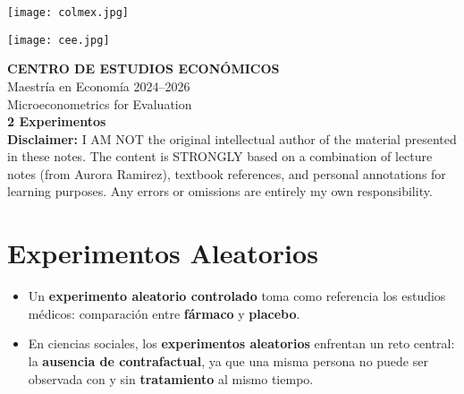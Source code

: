 \documentclass[12pt]{article}
\title{}
\author{}
\date{}
\begin{document}
\begin{titlepage}
    \vspace*{-1cm}
    \noindent
    \begin{minipage}[t]{0.49\textwidth}
        \texttt{[image: colmex.jpg]}
    \end{minipage}%
    \begin{minipage}[t]{0.49\textwidth}
        \raggedleft
        \texttt{[image: cee.jpg]}
    \end{minipage}

    \vspace*{2cm}

    \begin{center}
        \Huge \textbf{CENTRO DE ESTUDIOS ECONÓMICOS} \\[1.5em]
        \Large Maestría en Economía 2024--2026 \\[2em]
        \Large Microeconometrics for Evaluation \\[3em]
        \LARGE \textbf{2 Experimentos} \\[3em]
        \large \textbf{Disclaimer:} I AM NOT the original intellectual author of the material presented in these notes. The content is STRONGLY based on a combination of lecture notes (from Aurora Ramirez), textbook references, and personal annotations for learning purposes. Any errors or omissions are entirely my own responsibility.\\[0.9em]
        
    \end{center}

    \vfill
\end{titlepage}

\newpage

\setcounter{secnumdepth}{2}
\setcounter{tocdepth}{4}
\tableofcontents

\newpage

\section*{\noindent\textbf{Experimentos Aleatorios}}

\begin{itemize}
    \item Un \textbf{experimento aleatorio controlado} toma como referencia los estudios médicos: comparación entre \textbf{fármaco} y \textbf{placebo}.
    \item En ciencias sociales, los \textbf{experimentos aleatorios} enfrentan un reto central: la \textbf{ausencia de contrafactual}, ya que una misma persona no puede ser observada con y sin \textbf{tratamiento} al mismo tiempo.
\end{itemize}
\end{document}
